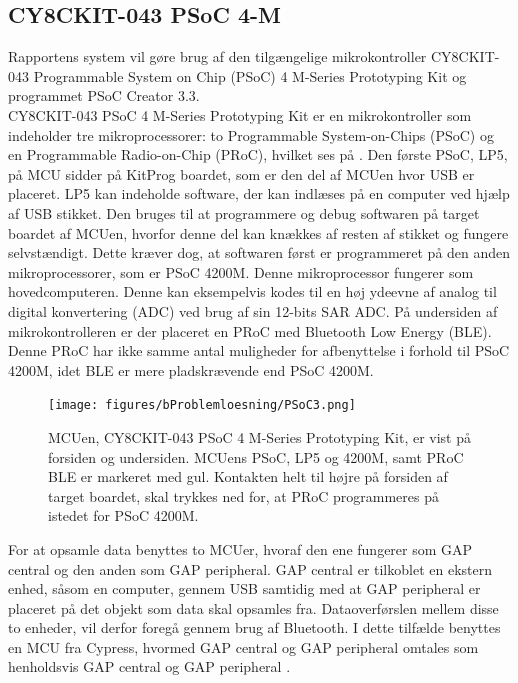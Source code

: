\subsection{CY8CKIT-043 PSoC 4-M}
Rapportens system vil gøre brug af den tilgængelige mikrokontroller CY8CKIT-043 Programmable System on Chip (PSoC) 4 M-Series Prototyping Kit og programmet PSoC Creator 3.3.\\
CY8CKIT-043 PSoC 4 M-Series Prototyping Kit er en mikrokontroller som indeholder tre mikroprocessorer: to Programmable System-on-Chips (PSoC) og en Programmable Radio-on-Chip (PRoC), hvilket ses på . Den første PSoC, LP5, på MCU sidder på KitProg boardet, som er den del af MCUen hvor USB er placeret. LP5 kan indeholde software, der kan indlæses på en computer ved hjælp af USB stikket. Den bruges til at programmere og debug softwaren på target boardet af MCUen, hvorfor denne del kan knækkes af resten af stikket og fungere selvstændigt. Dette kræver dog, at softwaren først er programmeret på den anden mikroprocessorer, som er PSoC 4200M. Denne mikroprocessor fungerer som hovedcomputeren. Denne kan eksempelvis kodes til en høj ydeevne af analog til digital konvertering (ADC) ved brug af sin 12-bits SAR ADC. \newline
På undersiden af mikrokontrolleren er der placeret en PRoC med Bluetooth Low Energy (BLE). Denne PRoC har ikke samme antal muligheder for afbenyttelse i forhold til PSoC 4200M, idet BLE er mere pladskrævende end PSoC 4200M. \citep{CYPRESS2016PSoC,Semiconductor2016,CYPRESS2016Cortexm0}
%
\begin{figure}[H]
	\centering
	\texttt{[image: figures/bProblemloesning/PSoC3.png]}
	\caption{MCUen, CY8CKIT-043 PSoC 4 M-Series Prototyping Kit, er vist på forsiden og undersiden. MCUens PSoC, LP5 og 4200M, samt PRoC BLE er markeret med gul.\newline
	 Kontakten helt til højre på forsiden af target boardet, skal trykkes ned for, at PRoC programmeres på istedet for PSoC 4200M. \citep{CYPRESS2016PSoC,Semiconductor2016}}
	\label{fig:PSoC}
\end{figure}\vspace{-0.2cm}
%
For at opsamle data benyttes to MCUer, hvoraf den ene fungerer som GAP central og den anden som GAP peripheral. GAP central er tilkoblet en ekstern enhed, såsom en computer, gennem USB samtidig med at GAP peripheral er placeret på det objekt som data skal opsamles fra. Dataoverførslen mellem disse to enheder, vil derfor foregå gennem brug af Bluetooth. I dette tilfælde benyttes en MCU fra Cypress, hvormed GAP central og GAP peripheral omtales som henholdsvis GAP central og GAP peripheral \citep{Luthra2015}. \newline

